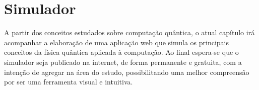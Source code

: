 \section{Simulador} 
A partir dos conceitos estudados sobre computação quântica, o atual capítulo irá acompanhar a elaboração  de uma aplicação web que simula os principais conceitos da física quântica aplicada à computação. Ao final espera-se que o simulador seja publicado na internet, de forma permanente e gratuita, com a intenção de agregar na área do estudo, possibilitando uma melhor compreensão por ser uma ferramenta visual e intuitiva. 
\newpage